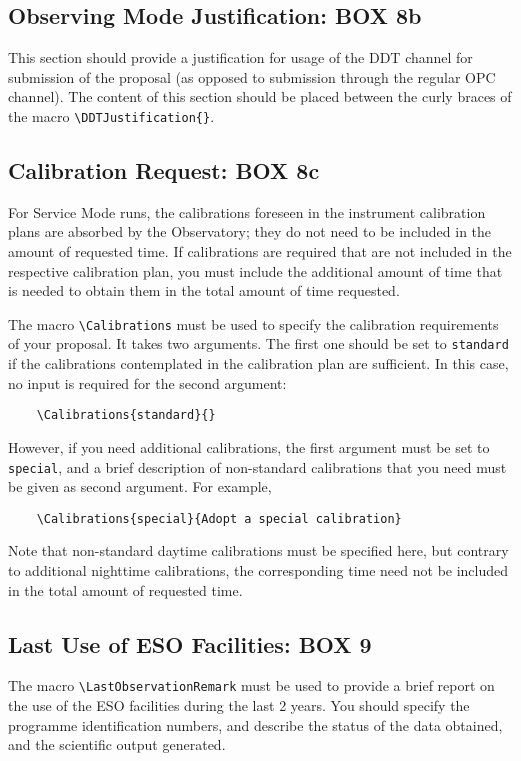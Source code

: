 \documentclass{article}
\begin{document}
\subsection{Observing Mode Justification: {\bf BOX 8b}}
This section should provide a justification for usage of the DDT
channel for submission of the proposal (as opposed to submission
through the regular OPC channel). The content of this section should
be placed between the curly braces of the macro
\verb|\DDTJustification{}|.


\subsection{Calibration Request: {\bf BOX 8c}}
For Service Mode runs, the calibrations foreseen in the instrument
calibration plans are 
absorbed by the Observatory; they do not need to be included in the
amount of requested time. If calibrations are required 
that are not included in the respective
calibration plan, you must include the additional amount
of time that is needed to obtain them in the total amount of time requested.

The macro \verb|\Calibrations| must be used to specify the calibration
requirements of your proposal. It takes two arguments. The first one
should be set to \verb|standard| if the calibrations contemplated in
the calibration plan are sufficient. In this case, no input is
required for the second argument:
\begin{verbatim}
    \Calibrations{standard}{}
\end{verbatim} 
However, if you need
additional calibrations, the first argument must be set to
\verb|special|, and a brief description of non-standard calibrations
that you need must be given as second argument. For example,
\begin{verbatim}
    \Calibrations{special}{Adopt a special calibration}
\end{verbatim} 
Note that non-standard
daytime calibrations must be specified here, but contrary to
additional nighttime calibrations, the corresponding time need not 
be included in the total amount of requested time. 


\subsection{Last Use of ESO Facilities: {\bf BOX 9}}
The macro \verb|\LastObservationRemark| must be used to 
provide a brief report on the use of the ESO facilities during the
last 2 years. You should specify the programme identification
numbers, and describe the status of the data obtained, and the 
scientific output generated.
\end{document}
